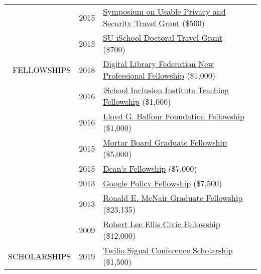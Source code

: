 \documentclass[12pt]{article}
\begin{document}
{{\begin{longtable}{Rp{1.0in}p{0.25in}p{4.75in}}
& \footnotesize{2015} & \href{https://cups.cs.cmu.edu/soups/2015/cfp.php}{{Symposium on Usable Privacy and Security Travel Grant}} (\$500) \\

& \footnotesize{2015} & \href{https://ischool.syr.edu/research/grants-and-awards/}{{SU iSchool Doctoral Travel Grant}} (\$700) \\

\textcolor{black}{\footnotesize{\uppercase{Fellowships}}} & \footnotesize{2018} & \href{https://forum2018.diglib.org/fellowship-opportunities/fellows/}{{Digital Library Federation New Professional Fellowship}} (\$1,000) \\

& \footnotesize{2016} & \href{http://www.sis.pitt.edu/i3/phd-fellows/fellow-profiles.html}{{iSchool Inclusion Institute Teaching Fellowship}} (\$1,000) \\

& \footnotesize{2016} & \href{https://www.bankofamerica.com/philanthropic/foundation.go?fnId=31}{{Lloyd G. Balfour Foundation Fellowship}} (\$1,000) \\

& \footnotesize{2015} & \href{https://news.syr.edu/2015/07/ischool-student-awarded-5000-mortar-board-fellowship-22021/}{{Mortar Board Graduate Fellowship}} (\$5,000) \\

& \footnotesize{2015} & \href{https://news.syr.edu/2012/04/ischool-advisersu-trustee-creates-new-summer-ph-d-fellowships/}{{Dean's Fellowship}} (\$7,000) \\

& \footnotesize{2013} & \href{https://www.google.com/policyfellowship/2013fellows.html}{{Google Policy Fellowship}} (\$7,500) \\

& \footnotesize{2013} & \href{https://www.syracuse.edu/admissions/cost-and-aid/types-of-aid/graduate-student-aid/fellowships/}{{Ronald E. McNair Graduate Fellowship}} (\$23,135) \\

& \footnotesize{2009} & \href{https://www.washington.edu/carlson/ellis-civic-fellowship/}{{Robert Lee Ellis Civic Fellowship}} (\$12,000) \\

\textcolor{black}{\footnotesize{\uppercase{Scholarships}}} & \footnotesize{2019} & \href{https://signal.twilio.com/}{{Twilio Signal Conference Scholarship}} (\$1,500) \\


\end{longtable}}}
\end{document}
